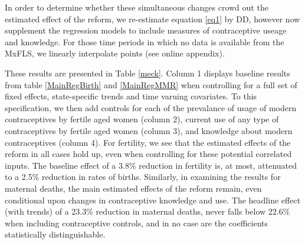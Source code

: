 \documentclass[a4paper, 11pt]{article}
\begin{document}
\begin{spacing}{2}
In order to determine whether these simultaneous changes crowd out the estimated effect of the reform, we re-estimate equation \eqref{eq1} by DD, however now supplement the regression models to include measures of contraceptive useage and knowledge.  For those time periods in which no data is available from the MxFLS, we linearly interpolate points (see online appendix).


These results are presented in Table \ref{meck}.  Column 1 displays baseline results from table \ref{MainRegBirth} and \ref{MainRegMMR} when controlling for a full set of fixed effects, state-specific trends and time varuing covariates.  To this specification, we then add controls for each of the prevalance of usage of modern contraceptives by fertile aged women (column 2), current use of any type of contraceptives by fertile aged women (column 3), and knowledge about modern contraceptives (column 4).  For fertility, we see that the estimated effects of the reform in all cases hold up, even when controlling for these potential correlated inputs.  The baseline effect of a 3.8\% reduction in fertility is, at most, attenuated to a 2.5\% reduction in rates of births.  Similarly, in examining the results for maternal deaths, the main estimated effects of the reform remain, even conditional upon changes in contraceptive knowledge and use.  The headline effect (with trends) of a 23.3\% reduction in maternal deaths, never falls below 22.6\% when including contraceptive controls, and in no case are the coefficients statistically distinguishable. 


\end{spacing}
\end{document}
